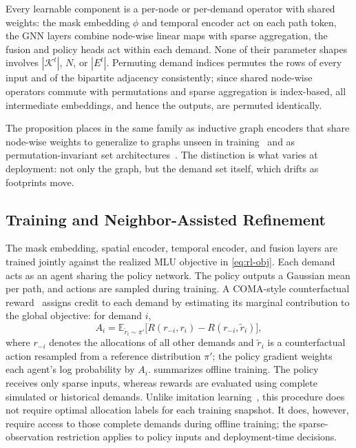 \begin{IEEEproof}
Every learnable component is a per-node or per-demand operator with shared
weights: the mask embedding $\phi$ and temporal encoder act on each path
token, the GNN layers combine node-wise linear maps with sparse
aggregation, the fusion and policy heads act within each demand. None of
their parameter shapes involves $|\mathcal{K}^t|$, $N$, or $|E^t|$.
Permuting demand indices permutes the rows of every input and of the
bipartite adjacency consistently; since shared node-wise operators commute
with permutations and sparse aggregation is index-based, all intermediate
embeddings, and hence the outputs, are permuted identically.
\end{IEEEproof}

The proposition places \sysname{} in the same family as inductive graph
encoders that share node-wise weights to generalize to graphs unseen in
training~\cite{hamilton2017} and as permutation-invariant set
architectures~\cite{zaheer2017}. The distinction is what varies at
deployment: not only the graph, but the demand set itself, which drifts as
footprints move.

\subsection{Training and Neighbor-Assisted Refinement}
\label{sec:training}

The mask embedding, spatial encoder, temporal encoder, and fusion layers
are trained jointly against the realized MLU objective in \cref{eq:rl-obj}.
Each demand acts as an agent sharing the policy network. The policy outputs
a Gaussian mean per path, and actions are sampled during training. A
COMA-style counterfactual reward~\cite{foerster2018} assigns credit to each
demand by estimating its marginal contribution to the global objective:
for demand $i$,
\begin{equation}
    A_i = \mathbb{E}_{\tilde{r}_i \sim \pi'}
        \bigl[ R(r_{-i}, r_i) - R(r_{-i}, \tilde{r}_i) \bigr],
    \label{eq:coma}
\end{equation}
where $r_{-i}$ denotes the allocations of all other demands and
$\tilde{r}_i$ is a counterfactual action resampled from a reference
distribution $\pi'$; the policy gradient weights each agent's log
probability by $A_i$.  summarizes offline training. The
policy receives only sparse inputs, whereas rewards are evaluated using
complete simulated or historical demands. Unlike imitation
learning~\cite{fnc}, this procedure does not require optimal allocation
labels for each training snapshot. It does, however, require access to
those complete demands during offline training; the sparse-observation
restriction applies to policy inputs and deployment-time decisions.

